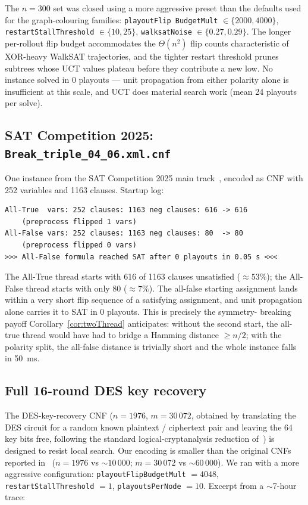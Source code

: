 \documentclass[11pt]{article}
\begin{document}
The $n=300$ set was closed using a more aggressive preset than the
defaults used for the graph-colouring families: \texttt{playoutFlip%
BudgetMult} $\in \{2000, 4000\}$, \texttt{restartStallThreshold}
$\in \{10, 25\}$, \texttt{walksatNoise} $\in \{0.27, 0.29\}$. The
longer per-rollout flip budget accommodates the $\Theta(n^2)$ flip
counts characteristic of XOR-heavy WalkSAT trajectories, and the
tighter restart threshold prunes subtrees whose UCT values plateau
before they contribute a new  low. No instance
solved in 0 playouts — unit propagation from either polarity alone
is insufficient at this scale, and UCT does material search work
(mean 24 playouts per solve).

\subsection{SAT Competition 2025:
\texttt{Break\_triple\_04\_06.xml.cnf}}

One instance from the SAT Competition 2025 main
track~\cite{satcomp:2025}, encoded as CNF with 252 variables and 1163
clauses. Startup log:
\begin{verbatim}
All-True  vars: 252 clauses: 1163 neg clauses: 616 -> 616
    (preprocess flipped 1 vars)
All-False vars: 252 clauses: 1163 neg clauses: 80  -> 80
    (preprocess flipped 0 vars)
>>> All-False formula reached SAT after 0 playouts in 0.05 s <<<
\end{verbatim}
The All-True thread starts with 616 of 1163 clauses unsatisfied
($\approx 53\%$); the All-False thread starts with only 80 ($\approx
7\%$). The all-false starting assignment lands within a very short
flip sequence of a satisfying assignment, and unit propagation alone
carries it to SAT in 0 playouts. This is precisely the symmetry-
breaking payoff Corollary~\ref{cor:twoThread} anticipates: without
the second start, the all-true thread would have had to bridge a
Hamming distance $\ge n/2$; with the polarity split, the all-false
distance is trivially short and the whole instance falls in 50~ms.

\subsection{Full 16-round DES key recovery}

The DES-key-recovery CNF ($n=1976$, $m=30\,072$, obtained by
translating the DES circuit for a random known plaintext / ciphertext
pair and leaving the 64 key bits free, following the standard
logical-cryptanalysis reduction of~\cite{massacci:descrypto}) is
designed to resist local search. Our encoding is smaller than the
original CNFs reported in~\cite{massacci:descrypto} ($n=1976$ vs
$\sim 10\,000$; $m=30\,072$ vs $\sim 60\,000$). We ran with a more aggressive configuration:
\texttt{playoutFlipBudgetMult} $= 4048$,
\texttt{restartStallThreshold} $= 1$,
\texttt{playoutsPerNode} $= 10$. Excerpt from a $\sim$7-hour trace:
\end{document}
